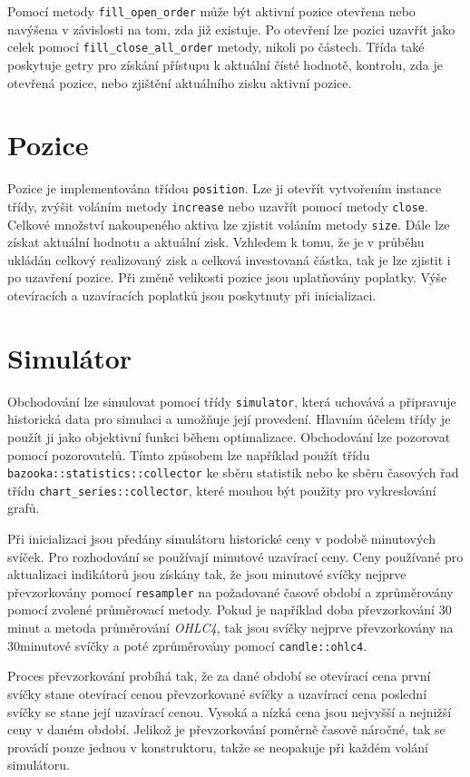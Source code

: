 Pomocí metody \texttt{fill\_open\_order} může být aktivní pozice otevřena nebo navýšena v závislosti na tom, zda již existuje.
Po otevření lze pozici uzavřít jako celek pomocí \texttt{fill\_close\_all\_order} metody, nikoli po částech.
Třída také poskytuje getry pro získání přístupu k aktuální čísté hodnotě, kontrolu, zda je otevřená pozice, nebo zjištění aktuálního zisku aktivní pozice.

\section{Pozice}
Pozice je implementována třídou \texttt{position}.
Lze ji otevřít vytvořením instance třídy, zvýšit voláním metody \texttt{increase} nebo uzavřít pomocí metody \texttt{close}.
Celkové množství nakoupeného aktiva lze zjistit voláním metody \texttt{size}.
Dále lze získat aktuální hodnotu a aktuální zisk.
Vzhledem k tomu, že je v průběhu ukládán celkový realizovaný zisk a celková investovaná částka, tak je lze zjistit i po uzavření pozice.
Při změně velikosti pozice jsou uplatňovány poplatky.
Výše otevíracích a uzavíracích poplatků jsou poskytnuty při inicializaci.

\section{Simulátor}
Obchodování lze simulovat pomocí třídy \texttt{simulator}, která uchovává a připravuje historická data pro simulaci a umožňuje její provedení.
Hlavním účelem třídy je použít ji jako objektivní funkci během optimalizace.
Obchodování lze pozorovat pomocí pozorovatelů.
Tímto způsobem lze například použít třídu \texttt{bazooka::statistics::collector} ke sběru statistik nebo ke sběru časových řad třídu \texttt{chart\_series::collector}, které mouhou být použity pro vykreslování grafů.

Při inicializaci jsou předány simulátoru historické ceny v podobě minutových svíček.
Pro rozhodování se používají minutové uzavírací ceny.
Ceny používané pro aktualizaci indikátorů jsou získány tak, že jsou minutové svíčky nejprve převzorkovány pomocí \texttt{resampler} na požadované časové období a zprůměrovány pomocí zvolené průměrovací metody.
Pokud je například doba převzorkování 30 minut a metoda průměrování \textit{OHLC4}, tak jsou svíčky nejprve převzorkovány na 30minutové svíčky a poté zprůměrovány pomocí \texttt{candle::ohlc4}.

Proces převzorkování probíhá tak, že za dané období se otevírací cena první svíčky stane otevírací cenou převzorkované svíčky a uzavírací cena poslední svíčky se stane její uzavírací cenou.
Vysoká a nízká cena jsou nejvyšší a nejnižší ceny v daném období.
Jelikož je převzorkování poměrně časově náročné, tak se provádí pouze jednou v konstruktoru, takže se neopakuje při každém volání simulátoru.

